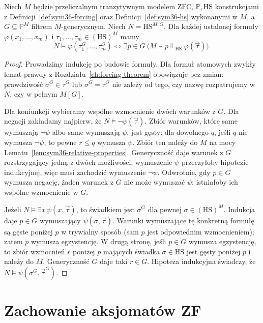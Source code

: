 \begin{twierdzenie}
\label{thm:sym36-truth}
Niech $M$ będzie przeliczalnym tranzytywnym
modelem ZFC, $\mathbb P,\mathrm{HS}$ konstrukcjami
z Definicji~\ref{def:sym36-forcing} oraz
Definicji~\ref{def:sym36-hs} wykonanymi w $M$,
a $G\subseteq\mathbb P^M$ filtrem $M$-generycznym.
Niech $N=\mathrm{HS}^{M,G}$.
Dla każdej ustalonej formuły
$\varphi(x_1,\ldots,x_m)$ i
$\tau_1,\ldots,\tau_m\in(\mathrm{HS})^M$ mamy
\[
 N\models\varphi(\tau_1^G,\ldots,\tau_m^G)
 \iff
 \exists p\in G\
 \bigl(M\models
   p\Vdash_{\mathrm{HS}}\varphi(\vec\tau)\bigr).
\]
\end{twierdzenie}
\begin{proof}
Prowadzimy indukcję po budowie formuły.
Dla formuł atomowych zwykły lemat prawdy
z Rozdziału~\ref{ch:forcing-theorem}
obowiązuje bez zmian: prawdziwość
$\sigma^G\in\tau^G$ lub $\sigma^G=\tau^G$
nie zależy od tego, czy nazwę rozpatrujemy
w $N$, czy w pełnym $M[G]$.

Dla koniunkcji wybieramy wspólne
wzmocnienie dwóch warunków z $G$.
Dla negacji zakładamy najpierw,
że $N\models\neg\psi(\vec\tau)$.
Zbiór warunków, które same wymuszają
$\neg\psi$ albo same wymuszają
$\psi$, jest gęsty:
dla dowolnego $q$, jeśli
$q$ nie wymusza $\neg\psi$,
to pewne $r\le q$ wymusza $\psi$.
Zbiór ten należy do $M$ na mocy
Lematu~\ref{lem:sym36-relative-properties}.
Generyczność daje warunek z $G$
rozstrzygający jedną z dwóch możliwości;
wymuszenie $\psi$ przeczyłoby
hipotezie indukcyjnej, więc musi
zachodzić wymuszenie $\neg\psi$.
Odwrotnie, gdy $p\in G$ wymusza negację,
żaden warunek z $G$ nie może wymuszać $\psi$:
istniałoby ich wspólne wzmocnienie w $G$.

Jeżeli $N\models\exists x\,\psi(x,\vec\tau)$,
to świadkiem jest $\sigma^G$ dla
pewnej $\sigma\in(\mathrm{HS})^M$.
Indukcja daje $p\in G$ wymuszający
$\psi(\sigma,\vec\tau)$.
Warunki wymuszające tę konkretną
formułę są gęste poniżej $p$
w trywialny sposób (sam $p$
jest odpowiednim wzmocnieniem);
zatem $p$ wymusza egzystencję.
W drugą stronę, jeśli $p\in G$
wymusza egzystencję, to zbiór
wzmocnień $r$ poniżej $p$
mających świadka $\sigma\in\mathrm{HS}$
jest gęsty poniżej $p$ i należy do $M$.
Generyczność $G$ daje taki $r\in G$.
Hipoteza indukcyjna świadczy,
że $N\models\psi(\sigma^G,\vec\tau^G)$.
\end{proof}

\section{Zachowanie aksjomatów ZF}

